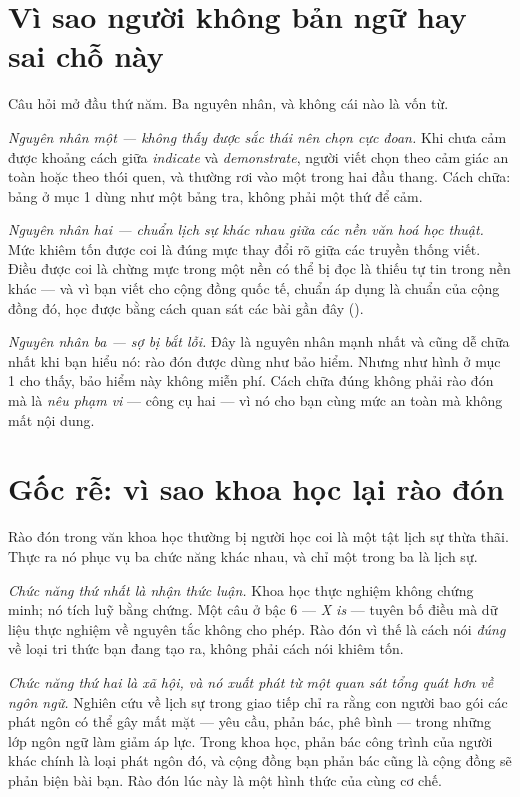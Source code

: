 \documentclass[../../english.tex]{subfiles}
\begin{document}
\section{Vì sao người không bản ngữ hay sai chỗ này}

Câu hỏi mở đầu thứ năm. Ba nguyên nhân, và không cái nào là vốn từ.

\emph{Nguyên nhân một --- không thấy được sắc thái nên chọn cực đoan.} Khi chưa cảm được khoảng cách giữa \emph{indicate} và \emph{demonstrate}, người viết chọn theo cảm giác an toàn hoặc theo thói quen, và thường rơi vào một trong hai đầu thang. Cách chữa: bảng ở mục 1 dùng như một bảng tra, không phải một thứ để cảm.

\emph{Nguyên nhân hai --- chuẩn lịch sự khác nhau giữa các nền văn hoá học thuật.} Mức khiêm tốn được coi là đúng mực thay đổi rõ giữa các truyền thống viết. Điều được coi là chừng mực trong một nền có thể bị đọc là thiếu tự tin trong nền khác --- và vì bạn viết cho cộng đồng quốc tế, chuẩn áp dụng là chuẩn của cộng đồng đó, học được bằng cách quan sát các bài gần đây ().

\emph{Nguyên nhân ba --- sợ bị bắt lỗi.} Đây là nguyên nhân mạnh nhất và cũng dễ chữa nhất khi bạn hiểu nó: rào đón được dùng như bảo hiểm. Nhưng như hình ở mục 1 cho thấy, bảo hiểm này không miễn phí. Cách chữa đúng không phải rào đón mà là \emph{nêu phạm vi} --- công cụ hai --- vì nó cho bạn cùng mức an toàn mà không mất nội dung.

\section{Gốc rễ: vì sao khoa học lại rào đón}

Rào đón trong văn khoa học thường bị người học coi là một tật lịch sự thừa thãi. Thực ra nó phục vụ ba chức năng khác nhau, và chỉ một trong ba là lịch sự.

\emph{Chức năng thứ nhất là nhận thức luận.} Khoa học thực nghiệm không chứng minh; nó tích luỹ bằng chứng. Một câu ở bậc 6 --- \emph{X is} --- tuyên bố điều mà dữ liệu thực nghiệm về nguyên tắc không cho phép. Rào đón vì thế là cách nói \emph{đúng} về loại tri thức bạn đang tạo ra, không phải cách nói khiêm tốn.

\emph{Chức năng thứ hai là xã hội, và nó xuất phát từ một quan sát tổng quát hơn về ngôn ngữ.} Nghiên cứu về lịch sự trong giao tiếp\cite{brownlevinson1987} chỉ ra rằng con người bao gói các phát ngôn có thể gây mất mặt --- yêu cầu, phản bác, phê bình --- trong những lớp ngôn ngữ làm giảm áp lực. Trong khoa học, phản bác công trình của người khác chính là loại phát ngôn đó, và cộng đồng bạn phản bác cũng là cộng đồng sẽ phản biện bài bạn. Rào đón lúc này là một hình thức của cùng cơ chế.
\end{document}
